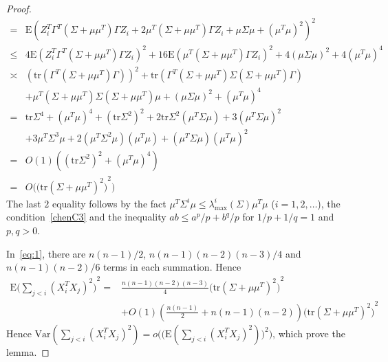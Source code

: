 \documentclass[review]{elsarticle}
\theoremstyle{plain}
\theoremstyle{definition}
\theoremstyle{remark}
\begin{document}
\begin{proof}
\begin{equation}
\begin{aligned}
            =&
            \mathrm{E}{(Z_i^T \Gamma^T (\Sigma+\mu\mu^T) \Gamma Z_i+ 2\mu^T (\Sigma+\mu\mu^T)\Gamma Z_i +\mu \Sigma \mu +(\mu^T\mu)^2 )}^2\\
            \leq&
            4\mathrm{E}(Z_i^T \Gamma^T (\Sigma+\mu\mu^T) \Gamma Z_i)^2+ 16\mathrm{E}(\mu^T (\Sigma+\mu\mu^T)\Gamma Z_i)^2 +4(\mu \Sigma \mu)^2 +4(\mu^T\mu)^4 \\
            \asymp&
            (\mathrm{tr}(\Gamma^T (\Sigma+\mu\mu^T)\Gamma))^2+\mathrm{tr}(\Gamma^T (\Sigma+\mu\mu^T)\Sigma(\Sigma+\mu\mu^T)\Gamma)\\
            &+ \mu^T (\Sigma+\mu\mu^T)\Sigma (\Sigma+\mu\mu^T)\mu+(\mu \Sigma \mu)^2 +(\mu^T\mu)^4 \\
            =&
            \mathrm{tr}\Sigma^4+
            {(\mu^T \mu)}^4+
            {(\mathrm{tr}\Sigma^2)}^2+
            2\mathrm{tr}\Sigma^2 (\mu^T \Sigma \mu)+
            3 {(\mu^T \Sigma \mu)}^2\\
            &+
            3\mu^T\Sigma^3 \mu+
            2(\mu^T\Sigma^2 \mu)(\mu^T\mu)+
            (\mu^T\Sigma \mu){(\mu^T\mu)}^2\\
            =&
            O(1)({(\mathrm{tr}\Sigma^2)}^2+(\mu^T\mu)^4)\\
            =&O\Big({\big(\mathrm{tr}(\Sigma+\mu\mu^T)^2\big)}^2\Big)
        \end{aligned}
    \end{equation}
    The last $2$ equality follows by the fact $\mu^T \Sigma^i \mu\leq \lambda_{\max}^i(\Sigma)\mu^T\mu$ ($i=1,2,\ldots$), the condition~\eqref{chenC3} and the inequality $ab\leq a^p/p+b^q/p$ for $1/p+1/q=1$ and $p,q>0$.
   
   In~\eqref{eq:1}, there are $n(n-1)/2$, $n(n-1)(n-2)(n-3)/4$ and $n(n-1)(n-2)/6$ terms in each summation. Hence
    \begin{equation}
    \begin{aligned}
        \mathrm{E}{\big(\sum_{j<i}{(X_i^T X_j)}^2\big)}^2
            =&\frac{n(n-1)(n-2)(n-3)}{4}{\big(\mathrm{tr}(\Sigma+\mu\mu^T)^2\big)}^2\\
            &+O(1)(\frac{n(n-1)}{2}+n(n-1)(n-2)){\big(\mathrm{tr}(\Sigma+\mu\mu^T)^2\big)}^2
    \end{aligned}
    \end{equation}
Hence $\mathrm{Var}(\sum_{j<i}{(X_i^T X_j)}^2)=o\Big(\big(\mathrm{E}(\sum_{j<i}{(X_i^T X_j)}^2)\big)^2\Big)$, which prove the lemma.
\end{proof}
\end{document}
